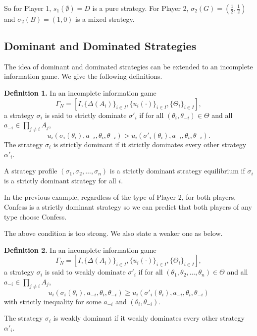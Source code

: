 \documentclass[12pt, oneside]{article}
\begin{document}
So for Player 1, \( s_1(\emptyset) = D \) is a pure strategy. For Player 2, \( \sigma_2(G) = \left( \frac{1}{2}, \frac{1}{2} \right) \) and \( \sigma_2(B) = (1,0) \) is a mixed strategy.

\subsection{Dominant and Dominated Strategies}
The idea of dominant and dominated strategies can be extended to an incomplete information game. We give the following definitions.

\textbf{Definition 1.} In an incomplete information game 
\[
\Gamma_N = [I, \{\Delta(A_i)\}_{i\in I}, \{u_i(\cdot)\}_{i\in I}, \{\Theta_i\}_{i\in I}],
\]
a strategy \(\sigma_i\) is said to strictly dominate \(\sigma'_i\) if for all \((\theta_i, \theta_{-i}) \in \Theta\) and all \(a_{-i} \in \prod_{j \neq i} A_j\),
\[
u_i(\sigma_i(\theta_i), a_{-i}, \theta_i, \theta_{-i}) > u_i(\sigma'_i(\theta_i), a_{-i}, \theta_i, \theta_{-i}).
\]
The strategy \(\sigma_i\) is strictly dominant if it strictly dominates every other strategy \(\alpha'_i\).

\vspace{0.5cm}

A strategy profile \((\sigma_1, \sigma_2, \dots, \sigma_n)\) is a strictly dominant strategy equilibrium if \(\sigma_i\) is a strictly dominant strategy for all \(i\).

In the previous example, regardless of the type of Player 2, for both players, Confess is a strictly dominant strategy so we can predict that both players of any type choose Confess.

The above condition is too strong. We also state a weaker one as below.

\vspace{0.5cm}

\textbf{Definition 2.} In an incomplete information game \[
\Gamma_N = [I, \{\Delta(A_i)\}_{i\in I}, \{u_i(\cdot)\}_{i\in I}, \{\Theta_i\}_{i\in I}],
\]
a strategy \(\sigma_i\) is said to weakly dominate \(\sigma'_i\) if for all \((\theta_1, \theta_2, \dots, \theta_n) \in \Theta\) and all \(a_{-i} \in \prod_{j \neq i} A_j\),
\[
u_i(\sigma_i(\theta_i), a_{-i}, \theta_i, \theta_{-i}) \geq u_i(\sigma'_i(\theta_i), a_{-i}, \theta_i, \theta_{-i})
\]
with strictly inequality for some \(a_{-i}\) and \((\theta_i, \theta_{-i})\).

The strategy \(\sigma_i\) is weakly dominant if it weakly dominates every other strategy \(\alpha'_i\).
\end{document}
